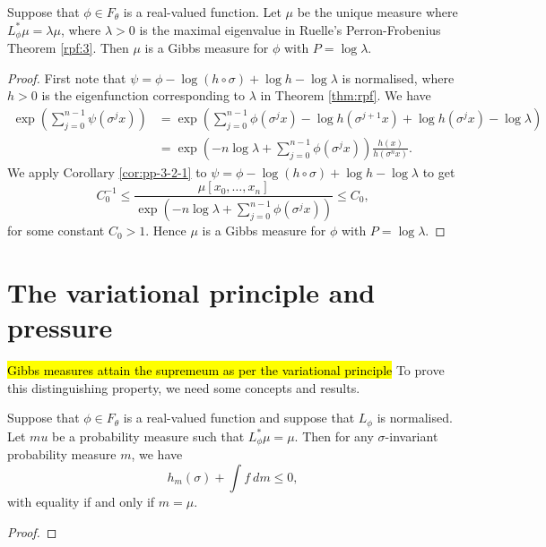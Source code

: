 \begin{corollary}
	Suppose that $\phi \in F_\theta$ is a real-valued function. Let $\mu$ be the unique measure where $L_\phi^*\mu = \lambda\mu$, where $\lambda > 0$ is the maximal eigenvalue in Ruelle's Perron-Frobenius Theorem \ref{rpf:3}. Then $\mu$ is a Gibbs measure for $\phi$ with $P = \log{\lambda}$.
	\begin{proof}
		First note that $\psi = \phi - \log{(h \circ \sigma)} + \log{h} - \log{\lambda}$ is normalised, where $h > 0$ is the eigenfunction corresponding to $\lambda$ in Theorem \ref{thm:rpf}. We have
		\begin{align*}
			\exp\left(\sum_{j = 0}^{n - 1}{\psi(\sigma^j{x})}\right) &= \exp\left(\sum_{j = 0}^{n - 1}{\phi(\sigma^j{x}) - \log{h(\sigma^{j + 1}{x})} + \log{h(\sigma^j{x})} - \log{\lambda}}\right) \\
				&= \exp\left(-n\log{\lambda} + \sum_{j = 0}^{n - 1}{\phi(\sigma^j{x})}\right) \frac{h(x)}{h(\sigma^n{x})}.
		\end{align*}
		We apply Corollary \ref{cor:pp-3-2-1} to $\psi = \phi - \log{(h \circ \sigma)} + \log{h} - \log{\lambda}$ to get
		\[
			C_0^{-1} \leq \frac{\mu[x_0, \dots, x_n]}{\exp\left(-n\log{\lambda} + \sum_{j = 0}^{n - 1}{\phi(\sigma^j{x})}\right)} \leq C_0,
		\]
		for some constant $C_0 > 1$. Hence $\mu$ is a Gibbs measure for $\phi$ with $P = \log{\lambda}$.
	\end{proof}
\end{corollary}

\section{The variational principle and pressure}
\hl{Gibbs measures attain the supremeum as per the variational principle} To prove this distinguishing property, we need some concepts and results.

\begin{proposition} \label{prop:pp-3-4}
	Suppose that $\phi \in F_\theta$ is a real-valued function and suppose that $L_\phi$ is normalised. Let $mu$ be a probability measure such that $L_\phi^*{\mu} = \mu$. Then for any $\sigma$-invariant probability measure $m$, we have
	\[
		h_m(\sigma) + \int{f\ dm} \leq 0,
	\]
	with equality if and only if $m = \mu$.
	\begin{proof}
		
	\end{proof}
\end{proposition}

